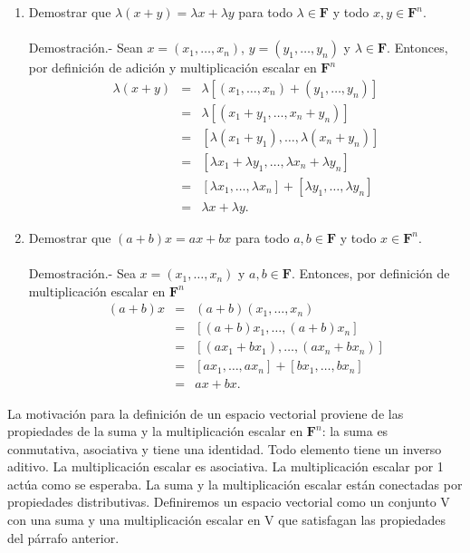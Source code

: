 \begin{enumerate}[\bfseries 1.]
    \item Demostrar que $\lambda (x+y)=\lambda x+\lambda y$ para todo $\lambda\in \textbf{F}$ y todo $x,y\in \textbf{F}^n$.\\\\
	Demostración.-\; Sean $x=(x_1,\ldots,x_n)$, $y=(y_1,\ldots , y_n)$ y $\lambda\in \textbf{F}$. Entonces, por definición de adición y multiplicación escalar en $\textbf{F}^n$ 
	$$\begin{array}{rcl}
	    \lambda (x+y)&=&\lambda\left[(x_1,\ldots,x_n)+(y_1,\ldots , y_n)\right]\\
		 &=&\lambda\left[(x_1+y_1,\ldots ,x_n+y_n)\right]\\
		 &=&\left[\lambda(x_1+y_1),\ldots ,\lambda(x_n+y_n)\right]\\
		 &=&\left[\lambda x_1+\lambda y_1,\ldots ,\lambda x_n+\lambda y_n\right]\\
		 &=&\left[\lambda x_1,\ldots ,\lambda x_n\right]+\left[\lambda y_1,\ldots ,\lambda y_n\right]\\
		 &=&\lambda x+\lambda y.
	\end{array}$$
	\vspace{.5cm}

    \item Demostrar que $(a+b)x=ax+bx$  para todo $a,b\in \textbf{F}$ y todo $x\in \textbf{F}^n$.\\\\
	Demostración.-\; Sea $x=(x_1,\ldots,x_n)$ y $a,b\in \textbf{F}$. Entonces, por definición de multiplicación escalar en $\textbf{F}^n$
	$$\begin{array}{rcl}
	    (a+b)x&=&(a+b)(x_1,\ldots,x_n)\\
		 &=&\left[(a+b)x_1,\ldots,(a+b)x_n\right]\\
		 &=&\left[(ax_1+bx_1),\ldots,(ax_n+bx_n)\right]\\
		 &=&\left[ax_1,\ldots,ax_n\right]+\left[bx_1,\ldots,bx_n\right]\\
		 &=&ax+bx.
	\end{array}$$
	\vspace{.5cm}

\end{enumerate}


La motivación para la definición de un espacio vectorial proviene de las propiedades de la suma y la multiplicación escalar en $\textbf{F}^n$: la suma es conmutativa, asociativa y tiene una identidad. Todo elemento tiene un inverso aditivo. La multiplicación escalar es asociativa. La multiplicación escalar por 1 actúa como se esperaba. La suma y la multiplicación escalar están conectadas por propiedades distributivas. Definiremos un espacio vectorial como un conjunto V con una suma y una multiplicación escalar en V que satisfagan las propiedades del párrafo anterior.

